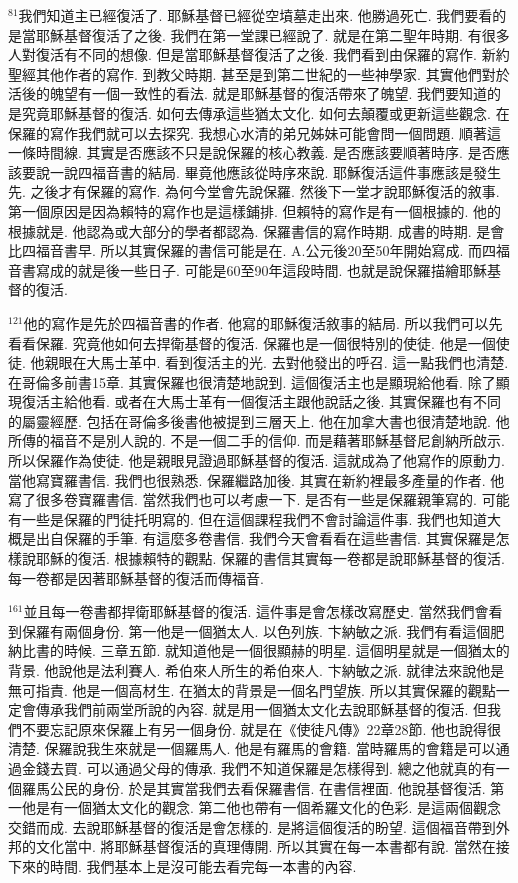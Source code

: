 \documentclass{book}
\begin{document}
$^{81}$我們知道主已經復活了.
耶穌基督已經從空墳墓走出來.
他勝過死亡.
我們要看的是當耶穌基督復活了之後.
我們在第一堂課已經說了.
就是在第二聖年時期.
有很多人對復活有不同的想像.
但是當耶穌基督復活了之後.
我們看到由保羅的寫作.
新約聖經其他作者的寫作.
到教父時期.
甚至是到第二世紀的一些神學家.
其實他們對於活後的魄望有一個一致性的看法.
就是耶穌基督的復活帶來了魄望.
我們要知道的是究竟耶穌基督的復活.
如何去傳承這些猶太文化.
如何去顛覆或更新這些觀念.
在保羅的寫作我們就可以去探究.
我想心水清的弟兄姊妹可能會問一個問題.
順著這一條時間線.
其實是否應該不只是說保羅的核心教義.
是否應該要順著時序.
是否應該要說一說四福音書的結局.
畢竟他應該從時序來說.
耶穌復活這件事應該是發生先.
之後才有保羅的寫作.
為何今堂會先說保羅.
然後下一堂才說耶穌復活的敘事.
第一個原因是因為賴特的寫作也是這樣鋪排.
但賴特的寫作是有一個根據的.
他的根據就是.
他認為或大部分的學者都認為.
保羅書信的寫作時期.
成書的時期.
是會比四福音書早.
所以其實保羅的書信可能是在.
A.公元後20至50年開始寫成.
而四福音書寫成的就是後一些日子.
可能是60至90年這段時間.
也就是說保羅描繪耶穌基督的復活.

$^{121}$他的寫作是先於四福音書的作者.
他寫的耶穌復活敘事的結局.
所以我們可以先看看保羅.
究竟他如何去捍衛基督的復活.
保羅也是一個很特別的使徒.
他是一個使徒.
他親眼在大馬士革中.
看到復活主的光.
去對他發出的呼召.
這一點我們也清楚.
在哥倫多前書15章.
其實保羅也很清楚地說到.
這個復活主也是顯現給他看.
除了顯現復活主給他看.
或者在大馬士革有一個復活主跟他說話之後.
其實保羅也有不同的屬靈經歷.
包括在哥倫多後書他被提到三層天上.
他在加拿大書也很清楚地說.
他所傳的福音不是別人說的.
不是一個二手的信仰.
而是藉著耶穌基督尼創納所啟示.
所以保羅作為使徒.
他是親眼見證過耶穌基督的復活.
這就成為了他寫作的原動力.
當他寫寶羅書信.
我們也很熟悉.
保羅繼路加後.
其實在新約裡最多產量的作者.
他寫了很多卷寶羅書信.
當然我們也可以考慮一下.
是否有一些是保羅親筆寫的.
可能有一些是保羅的門徒托明寫的.
但在這個課程我們不會討論這件事.
我們也知道大概是出自保羅的手筆.
有這麼多卷書信.
我們今天會看看在這些書信.
其實保羅是怎樣說耶穌的復活.
根據賴特的觀點.
保羅的書信其實每一卷都是說耶穌基督的復活.
每一卷都是因著耶穌基督的復活而傳福音.

$^{161}$並且每一卷書都捍衛耶穌基督的復活.
這件事是會怎樣改寫歷史.
當然我們會看到保羅有兩個身份.
第一他是一個猶太人.
以色列族.
卞納敏之派.
我們有看這個肥納比書的時候.
三章五節.
就知道他是一個很顯赫的明星.
這個明星就是一個猶太的背景.
他說他是法利賽人.
希伯來人所生的希伯來人.
卞納敏之派.
就律法來說他是無可指責.
他是一個高材生.
在猶太的背景是一個名門望族.
所以其實保羅的觀點一定會傳承我們前兩堂所說的內容.
就是用一個猶太文化去說耶穌基督的復活.
但我們不要忘記原來保羅上有另一個身份.
就是在《使徒凡傳》22章28節.
他也說得很清楚.
保羅說我生來就是一個羅馬人.
他是有羅馬的會籍.
當時羅馬的會籍是可以通過金錢去買.
可以通過父母的傳承.
我們不知道保羅是怎樣得到.
總之他就真的有一個羅馬公民的身份.
於是其實當我們去看保羅書信.
在書信裡面.
他說基督復活.
第一他是有一個猶太文化的觀念.
第二他也帶有一個希羅文化的色彩.
是這兩個觀念交錯而成.
去說耶穌基督的復活是會怎樣的.
是將這個復活的盼望.
這個福音帶到外邦的文化當中.
將耶穌基督復活的真理傳開.
所以其實在每一本書都有說.
當然在接下來的時間.
我們基本上是沒可能去看完每一本書的內容.
\end{document}
